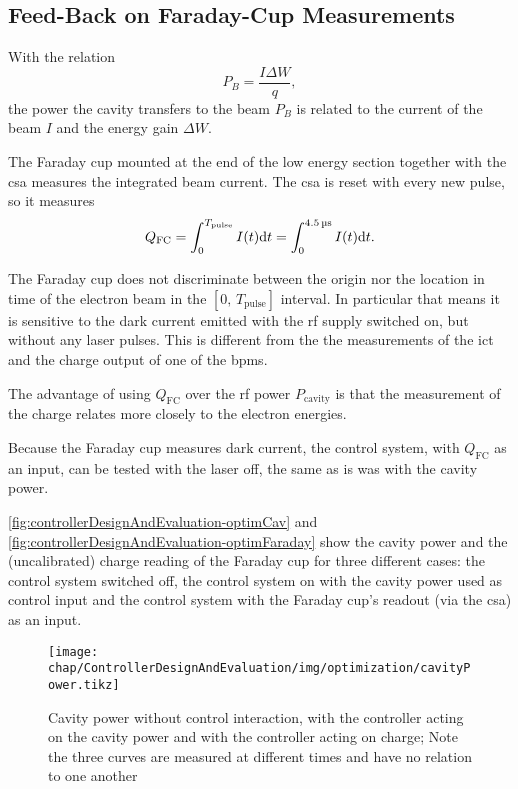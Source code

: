 \subsection{Feed-Back on Faraday-Cup Measurements}
With the relation
\begin{equation}
P_B = \frac{I \Delta W}{q},
\end{equation}
the power the cavity transfers to the beam $P_B$ is related to the current of the beam $I$ and the energy gain $\Delta W$. \cite[p.~43]{Wangler2008}

The Faraday cup mounted at the end of the low energy section together with the \gls{csa} measures the integrated beam current. The \gls{csa} is reset with every new pulse, so it measures
\begin{equation}
Q_\text{FC} = \int_{0}^{T_\text{pulse}} I(t) \text{d}{t} = \int_{0}^{\SI{4.5}{\micro\second}} I(t) \text{d}{t}.
\end{equation}

The Faraday cup does not discriminate between the origin nor the location in time of the electron beam in the $[0,\,T_\text{pulse}]$ interval. In particular that means it is sensitive to the dark current emitted with the \gls{rf} supply switched on, but without any laser pulses. This is different from the the measurements of the \gls{ict} and the charge output of one of the \glspl{bpm}. \cite{Nasse2019}

The advantage of using $Q_\text{FC}$ over the \gls{rf} power $P_\text{cavity}$ is that the measurement of the charge relates more closely to the electron energies.

Because the Faraday cup measures dark current, the control system, with $Q_\text{FC}$ as an input, can be tested with the laser off, the same as is was with the cavity power.

\autoref{fig:controllerDesignAndEvaluation-optimCav} and \autoref{fig:controllerDesignAndEvaluation-optimFaraday} show the cavity power and the (uncalibrated) charge reading of the Faraday cup for three different cases: the control system switched off, the control system on with the cavity power used as control input and the control system with the Faraday cup's readout (via the \gls{csa}) as an input.

\begin{figure}[tb]
	\centering
	\texttt{[image: chap/ControllerDesignAndEvaluation/img/optimization/cavityPower.tikz]}
	\caption{Cavity power without control interaction, with the controller acting on the cavity power and with the controller acting on charge; Note the three curves are measured at different times and have no relation to one another}
	\label{fig:controllerDesignAndEvaluation-optimCav}
\end{figure}

